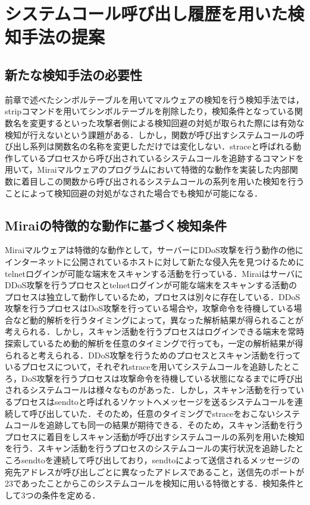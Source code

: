 \chapter{システムコール呼び出し履歴を用いた検知手法の提案}

\section{新たな検知手法の必要性}
前章で述べたシンボルテーブルを用いてマルウェアの検知を行う検知手法では，stripコマンドを用いてシンボルテーブルを削除したり，検知条件となっている関数名を変更するといった攻撃者側による検知回避の対処が取られた際には有効な検知が行えないという課題がある．しかし，関数が呼び出すシステムコールの呼び出し系列は関数名の名称を変更しただけでは変化しない．straceと呼ばれる動作しているプロセスから呼び出されているシステムコールを追跡するコマンドを用いて，Miraiマルウェアのプログラムにおいて特徴的な動作を実装した内部関数に着目しこの関数から呼び出されるシステムコールの系列を用いた検知を行うことによって検知回避の対処がなされた場合でも検知が可能になる．



\section{Miraiの特徴的な動作に基づく検知条件}
Miraiマルウェアは特徴的な動作として，サーバーにDDoS攻撃を行う動作の他にインターネットに公開されているホストに対して新たな侵入先を見つけるためにtelnetログインが可能な端末をスキャンする活動を行っている．MiraiはサーバにDDoS攻撃を行うプロセスとtelnetログインが可能な端末をスキャンする活動のプロセスは独立して動作しているため，プロセスは別々に存在している．DDoS攻撃を行うプロセスはDoS攻撃を行っている場合や，攻撃命令を待機している場合など動的解析を行うタイミングによって，異なった解析結果が得られることが考えられる．しかし，スキャン活動を行うプロセスはログインできる端末を常時探索しているため動的解析を任意のタイミングで行っても，一定の解析結果が得られると考えられる．DDoS攻撃を行うためのプロセスとスキャン活動を行っているプロセスについて，それぞれstraceを用いてシステムコールを追跡したところ，DoS攻撃を行うプロセスは攻撃命令を待機している状態になるまでに呼び出されるシステムコールは様々なものがあった．しかし，スキャン活動を行っているプロセスはsendtoと呼ばれるソケットへメッセージを送るシステムコールを連続して呼び出していた．そのため，任意のタイミングでstraceをおこないシステムコールを追跡しても同一の結果が期待できる．そのため，スキャン活動を行うプロセスに着目をしスキャン活動が呼び出すシステムコールの系列を用いた検知を行う．スキャン活動を行うプロセスのシステムコールの実行状況を追跡したところsendtoを連続して呼び出しており，sendtoによって送信されるメッセージの宛先アドレスが呼び出しごとに異なったアドレスであること，送信先のポートが23であったことからこのシステムコールを検知に用いる特徴とする．検知条件として3つの条件を定める．


